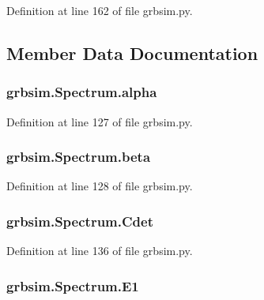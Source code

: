 Definition at line 162 of file grbsim.\-py.



\subsection{Member Data Documentation}
\hypertarget{classgrbsim_1_1_spectrum_ac49f98a702d92ff88e7246054c499155}{
\subsubsection[{alpha}]{\setlength{\rightskip}{0pt plus 5cm}grbsim.\-Spectrum.\-alpha}}\label{classgrbsim_1_1_spectrum_ac49f98a702d92ff88e7246054c499155}


Definition at line 127 of file grbsim.\-py.

\hypertarget{classgrbsim_1_1_spectrum_a27416e9bb05f72bffd0fb0a62e0351e4}{
\subsubsection[{beta}]{\setlength{\rightskip}{0pt plus 5cm}grbsim.\-Spectrum.\-beta}}\label{classgrbsim_1_1_spectrum_a27416e9bb05f72bffd0fb0a62e0351e4}


Definition at line 128 of file grbsim.\-py.

\hypertarget{classgrbsim_1_1_spectrum_a7235dfb6df1f5c3d4dde63df75a42a96}{
\subsubsection[{Cdet}]{\setlength{\rightskip}{0pt plus 5cm}grbsim.\-Spectrum.\-Cdet}}\label{classgrbsim_1_1_spectrum_a7235dfb6df1f5c3d4dde63df75a42a96}


Definition at line 136 of file grbsim.\-py.

\hypertarget{classgrbsim_1_1_spectrum_a6c5990e37a514e33cf05745e1e0b4eea}{
\subsubsection[{E1}]{\setlength{\rightskip}{0pt plus 5cm}grbsim.\-Spectrum.\-E1}}\label{classgrbsim_1_1_spectrum_a6c5990e37a514e33cf05745e1e0b4eea}


